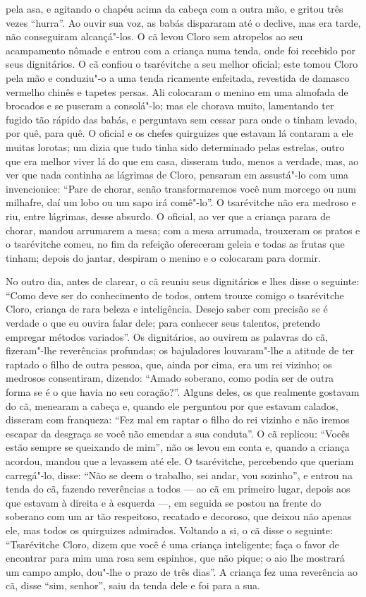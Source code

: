 pela asa, e agitando o chapéu acima da cabeça com a outra mão, e gritou três vezes ``hurra''. Ao ouvir sua voz, as babás dispararam até o
declive, mas era tarde, não conseguiram alcançá"-los. O cã levou Cloro
sem atropelos ao seu acampamento nômade e entrou com a criança numa
tenda, onde foi recebido por seus dignitários. O cã confiou o
tsarévitche a seu melhor oficial; este tomou Cloro pela mão e conduziu"-o
a uma tenda ricamente enfeitada, revestida de damasco vermelho chinês e
tapetes persas. Ali colocaram o menino em uma almofada de brocados e se
puseram a consolá"-lo; mas ele chorava muito, lamentando ter fugido tão
rápido das babás, e perguntava sem cessar para onde o tinham levado, por
quê, para quê. O oficial e os chefes quirguizes que estavam lá contaram
a ele muitas lorotas; um dizia que tudo tinha sido determinado pelas
estrelas, outro que era melhor viver lá do que em casa, disseram tudo,
menos a verdade, mas, ao ver que nada continha as lágrimas de Cloro,
pensaram em assustá"-lo com uma invencionice: ``Pare de chorar, senão
transformaremos você num morcego ou num milhafre, daí um lobo ou um sapo
irá comê"-lo''. O tsarévitche não era medroso e riu, entre lágrimas,
desse absurdo. O oficial, ao ver que a criança parara de chorar, mandou
arrumarem a mesa; com a mesa arrumada, trouxeram os pratos e o
tsarévitche comeu, no fim da refeição ofereceram geleia e todas as
frutas que tinham; depois do jantar, despiram o menino e o colocaram
para dormir.

No outro dia, antes de clarear, o cã reuniu seus dignitários e lhes
disse o seguinte: ``Como deve ser do conhecimento de todos, ontem trouxe
comigo o tsarévitche Cloro, criança de rara beleza e inteligência.
Desejo saber com precisão se é verdade o que eu ouvira falar dele; para
conhecer seus talentos, pretendo empregar métodos variados''. Os
dignitários, ao ouvirem as palavras do cã, fizeram"-lhe reverências
profundas; os bajuladores louvaram"-lhe a atitude de ter raptado o filho
de outra pessoa, que, ainda por cima, era um rei vizinho; os medrosos
consentiram, dizendo: ``Amado soberano, como podia ser de outra forma se
é o que havia no seu coração?''. Alguns deles, os que realmente gostavam
do cã, menearam a cabeça e, quando ele perguntou por que estavam
calados, disseram com franqueza: ``Fez mal em raptar o filho do rei
vizinho e não iremos escapar da desgraça se você não emendar a sua
conduta''. O cã replicou: ``Vocês estão sempre se queixando de mim'',
não os levou em conta e, quando a criança acordou, mandou que a levassem
até ele. O tsarévitche, percebendo que queriam carregá"-lo, disse: ``Não
se deem o trabalho, sei andar, vou sozinho'', e entrou na tenda do cã,
fazendo reverências a todos --- ao cã em primeiro lugar, depois aos que
estavam à direita e à esquerda ---, em seguida se postou na frente do
soberano com um ar tão respeitoso, recatado e decoroso, que deixou não
apenas ele, mas todos os quirguizes admirados. Voltando a si, o cã disse
o seguinte: ``Tsarévitche Cloro, dizem que você é uma criança
inteligente; faça o favor de encontrar para mim uma rosa sem espinhos,
que não pique; o aio lhe mostrará um campo amplo, dou"-lhe o prazo de
três dias''. A criança fez uma reverência ao cã, disse ``sim, senhor'',
saiu da tenda dele e foi para a sua.

